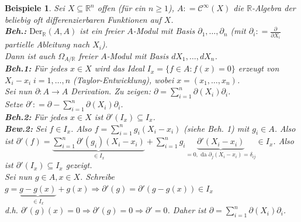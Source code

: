 \documentclass[a4paper,12pt]{scrbook}
\theoremstyle{break}
\theoremstyle{nonumberbreak}
\newtheorem{nnBsp}{Beispiele}
\theoremstyle{nonumberplain}
\newcommand{\defeqr}[0]{\mathrel{\mathop:}=}
\begin{document}
\begin{nnBsp}
  Sei $X \subseteq \mathbb{R}^n$ offen (für ein $n \geq 1$), $A \defeqr
  \mathcal{C}^{\infty}(X)$ die $\mathbb{R}$-Algebra der beliebig oft
  differenzierbaren Funktionen auf $X$.\\
  \textbf{Beh.:} $\mbox{Der}_{\mathbb{R}}(A,A)$ ist ein freier $A$-Modul mit
  Basis $\partial_1, \dots , \partial_n$ (mit $\partial_i \defeqr 
  \frac{\partial}{\partial X_i}$ partielle Ableitung nach $X_i$).\\
  Dann ist auch $\Omega_{A/\mathbb{R}}$ freier $A$-Modul mit Basis $d X_1, \dots , d
  X_n$.\\
  \textbf{Beh.1:} Für jedes $x \in X$ wird das Ideal $I_x = \{ f \in A: f(x) = 0
  \}$ erzeugt von $X_i - x_i \; i = 1 , \dots , n$ (Taylor-Entwicklung), wobei
  $x = (x_1, \dots , x_n)$.\\
  Sei nun $\partial: A \to A$ Derivation. Zu zeigen: $\partial = \sum_{i = 1}^n
  \partial(X_i) \partial_i$.\\
  Setze $\partial' \defeqr \partial - \sum_{i = 1}^n \partial(X_i) \partial_i$.\\
  \textbf{Beh.2:} Für jedes $x \in X$ ist $\partial'(I_x) \subseteq I_x$.\\
  \textbf{Bew.2:} Sei $f \in I_x$. Also $f = \sum_{i = 1}^n g_i (X_i - x_i)$ (siehe
  Beh. 1) mit $g_i \in A$. Also ist $\partial'(f) = \underset{\in
  I_x}{\underbrace{\sum_{i = 1}^n
  \partial'(g_i)(X_i - x_i)}} + \sum_{i = 1}^n g_i \underset{=0, \text{ da } \partial_j(X_i-x_i)=\delta_{ij}}{\underbrace{\partial'(X_i -
  x_i)}} \in I_x$. Also ist $\partial'(I_x) \subseteq I_x$ gezeigt.\\
  Sei nun $g \in A, x \in X$.
  Schreibe $g = \underset{\in I_x}{\underbrace{g - g(x)}} + g(x) \Rightarrow
  \partial'(g) = \partial'(g - g(x)) \in I_x$\\
  d.h. $\partial'(g)(x) = 0 \Rightarrow \partial'(g) = 0 \Rightarrow \partial' =
  0$. Daher ist $\partial = \sum_{i = 1}^n \partial(X_i) \partial_i$.
\end{nnBsp}
\end{document}
